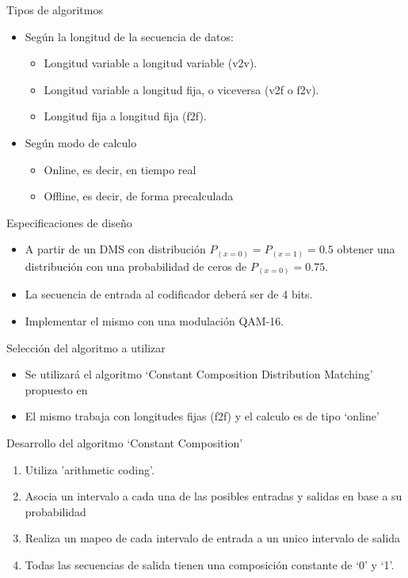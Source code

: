 \documentclass[xcolor=table]{beamer}
\begin{document}
\begin{frame}{Tipos de algoritmos}
\begin{itemize}
    \item Según la longitud de la secuencia de datos:
     \begin{itemize}
         \item Longitud variable a longitud variable (v2v).
        \item Longitud variable a longitud fija, o viceversa (v2f o f2v).
        \item Longitud fija a longitud fija (f2f).
     \end{itemize}
    \item Según modo de calculo
    \begin{itemize}
        \item Online, es decir, en tiempo real
        \item Offline, es decir, de forma precalculada
    \end{itemize}
\end{itemize}
\end{frame}



\begin{frame}{Especificaciones de diseño}
\begin{itemize}
    \item A partir de un DMS con distribución $ P_{(x=0)}= P_{(x=1)}=0.5$ obtener una distribución con una probabilidad de ceros de $P_{(x=0)}= 0.75$.
    \item La secuencia de entrada al codificador deberá ser de 4 bits.
    \item Implementar el mismo con una modulación QAM-16.
\end{itemize}
\end{frame}


\begin{frame}{Selección del algoritmo a utilizar}
\begin{itemize}
    \item Se utilizará el algoritmo `Constant Composition Distribution Matching' propuesto en \cite{schulte}
    \item El mismo trabaja con longitudes fijas (f2f) y el calculo es de tipo `online' 
\end{itemize}
\end{frame}


\begin{frame}{Desarrollo del algoritmo ‘Constant Composition’ }
\begin{enumerate}
    \item Utiliza 'arithmetic coding'.
    \item Asocia un intervalo a cada una de las posibles entradas y salidas en base a su probabilidad
    \item Realiza un mapeo de cada intervalo de entrada a un unico intervalo de salida
    \item Todas las secuencias de salida tienen una composición constante de `0' y `1'.
\end{enumerate}
\end{frame}
\end{document}
